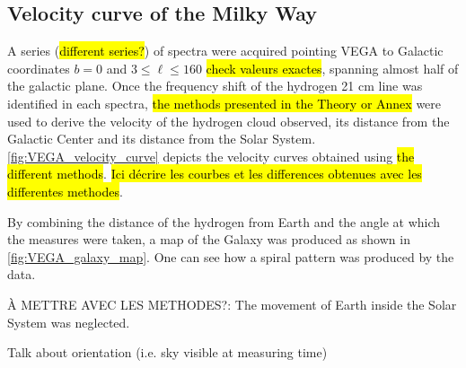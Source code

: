 \subsection{Velocity curve of the Milky Way}
A series (\hl{different series?}) of spectra were acquired pointing VEGA to Galactic coordinates $b = 0$ and $3 \leq \ell \leq 160$ \hl{check valeurs exactes}, spanning almost half of the galactic plane.
Once the frequency shift of the hydrogen 21 cm line was identified in each spectra, \hl{the methods presented in the Theory or Annex} were used to derive the velocity of the hydrogen cloud observed, its distance from the Galactic Center and its distance from the Solar System.
\autoref{fig:VEGA_velocity_curve} depicts the velocity curves obtained using \hl{the different methods}.
\hl{Ici décrire les courbes et les differences obtenues avec les differentes methodes}.

By combining the distance of the hydrogen from Earth and the angle at which the measures were taken, a map of the Galaxy was produced as shown in \autoref{fig:VEGA_galaxy_map}. One can see how a spiral pattern was produced by the data.

À METTRE AVEC LES METHODES?: The movement of Earth inside the Solar System was neglected.

Talk about orientation (i.e. sky visible at measuring time)

